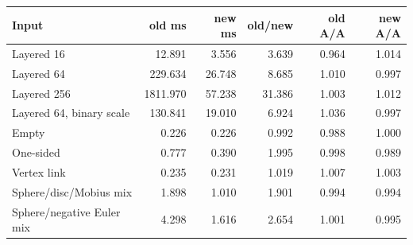 \begin{center}
\small
\begin{tabular}{lrrrrr}
\toprule
Input & old ms & new ms & old/new & old A/A & new A/A\\
\midrule
Layered 16 & 12.891 & 3.556 & 3.639 & 0.964 & 1.014\\
Layered 64 & 229.634 & 26.748 & 8.685 & 1.010 & 0.997\\
Layered 256 & 1811.970 & 57.238 & 31.386 & 1.003 & 1.012\\
Layered 64, binary scale & 130.841 & 19.010 & 6.924 & 1.036 & 0.997\\
Empty & 0.226 & 0.226 & 0.992 & 0.988 & 1.000\\
One-sided & 0.777 & 0.390 & 1.995 & 0.998 & 0.989\\
Vertex link & 0.235 & 0.231 & 1.019 & 1.007 & 1.003\\
Sphere/disc/Mobius mix & 1.898 & 1.010 & 1.901 & 0.994 & 0.994\\
Sphere/negative Euler mix & 4.298 & 1.616 & 2.654 & 1.001 & 0.995\\
\bottomrule
\end{tabular}
\end{center}
